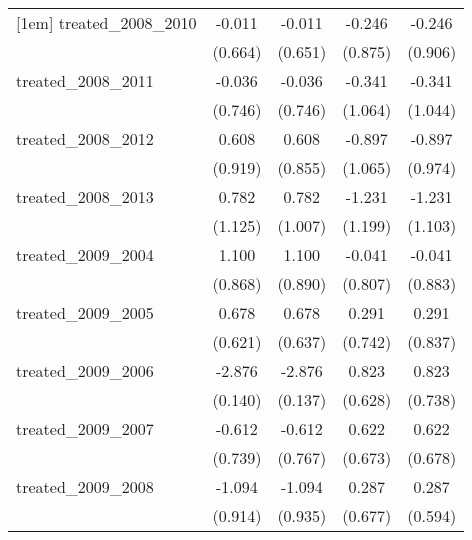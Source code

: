 {\begin{tabular}{l*{4}{c}}
[1em]
treated\_2008\_2010&      -0.011         &      -0.011         &      -0.246         &      -0.246         \\
            &     (0.664)         &     (0.651)         &     (0.875)         &     (0.906)         \\
[1em]
treated\_2008\_2011&      -0.036         &      -0.036         &      -0.341         &      -0.341         \\
            &     (0.746)         &     (0.746)         &     (1.064)         &     (1.044)         \\
[1em]
treated\_2008\_2012&       0.608         &       0.608         &      -0.897         &      -0.897         \\
            &     (0.919)         &     (0.855)         &     (1.065)         &     (0.974)         \\
[1em]
treated\_2008\_2013&       0.782         &       0.782         &      -1.231         &      -1.231         \\
            &     (1.125)         &     (1.007)         &     (1.199)         &     (1.103)         \\
[1em]
treated\_2009\_2004&       1.100         &       1.100         &      -0.041         &      -0.041         \\
            &     (0.868)         &     (0.890)         &     (0.807)         &     (0.883)         \\
[1em]
treated\_2009\_2005&       0.678         &       0.678         &       0.291         &       0.291         \\
            &     (0.621)         &     (0.637)         &     (0.742)         &     (0.837)         \\
[1em]
treated\_2009\_2006&      -2.876\sym{***}&      -2.876\sym{***}&       0.823         &       0.823         \\
            &     (0.140)         &     (0.137)         &     (0.628)         &     (0.738)         \\
[1em]
treated\_2009\_2007&      -0.612         &      -0.612         &       0.622         &       0.622         \\
            &     (0.739)         &     (0.767)         &     (0.673)         &     (0.678)         \\
[1em]
treated\_2009\_2008&      -1.094         &      -1.094         &       0.287         &       0.287         \\
            &     (0.914)         &     (0.935)         &     (0.677)         &     (0.594)         \\

\end{tabular}}
